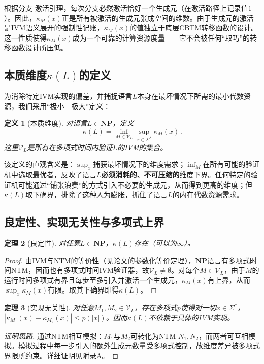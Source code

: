 \documentclass{ctexart}
\newtheorem{theorem}{定理}[section]
\newtheorem{definition}[theorem]{定义}
\newtheorem{proof}[theorem]{证明}
\begin{document}
	根据分支-激活引理，每次分支必然激活恰好一个生成元（在激活路径上记录值$1$）。因此，$\kappa_M(x)$正是所有被激活的生成元张成空间的维数。由于生成元的激活是IVM语义展开的强制性记账，$\kappa_M(x)$的值独立于底层CBTM转移函数的设计。这一性质使得$\kappa_M(x)$成为一个可靠的计算资源度量——它不会被任何``取巧''的转移函数设计所压低。
	
	\subsection{本质维度$\kappa(L)$的定义}
	
	为消除特定IVM实现的偏差，并捕捉语言$L$本身在最坏情况下所需的最小代数资源，我们采用``极小—极大''定义：
	
	\begin{definition}[本质维度]\label{def:kappa}
		对语言$L\in\mathbf{NP}$，定义
		\[
		\boxed{\ \kappa(L)=\inf_{M\in\mathcal{V}_L}\sup_{x\in\Sigma^*}\kappa_M(x)\ }.
		\]
		这里$\mathcal{V}_L$是所有在多项式时间内验证$L$的IVM的集合。
	\end{definition}
	
	该定义的直观含义是：$\sup_x$捕获最坏情况下的维度需求；$\inf_M$在所有可能的验证机中选取最优者，反映了语言$L$\textbf{必须消耗的、不可压缩的}维度下界。任何特定的验证机可能通过``铺张浪费''的方式引入不必要的生成元，从而得到更高的维度；但$\kappa(L)$取下确界，排除了这种人为膨胀，抓住了语言$L$的内在代数资源需求。
	
	\subsection{良定性、实现无关性与多项式上界}
	
	\begin{theorem}[良定性]\label{thm:well-defined}
		对任意$L\in\mathbf{NP}$，$\kappa(L)$存在（可以为$\infty$）。
	\end{theorem}
	\begin{proof}
		由IVM与NTM的等价性（见论文\cite{models2026}的参数化等价定理），$\mathbf{NP}$语言有多项式时间NTM，因而也有多项式时间IVM验证器，故$\mathcal{V}_L\neq\emptyset$。对每个$M\in\mathcal{V}_L$，由于$M$的运行时间多项式有界且每步至多引入并激活一个生成元，$\kappa_M(x)$有上界，从而$\sup_x\kappa_M(x)$有限。取其下确界即得$\kappa(L)$。
	\end{proof}
	
	\begin{theorem}[实现无关性]\label{thm:implementation-indep}
		对任意$M_1,M_2\in\mathcal{V}_L$，存在多项式$p$使得对一切$x\in\Sigma^*$，$|\kappa_{M_1}(x)-\kappa_{M_2}(x)|\le p(|x|)$。因而$\kappa(L)$不依赖于具体的IVM实现。
	\end{theorem}
	\begin{proof}[证明思路]
		通过NTM相互模拟：$M_1$与$M_2$可转化为NTM $N_1,N_2$，而两者可互相模拟。模拟过程中每一步引入的额外生成元数量受多项式控制，故维度差异被多项式界限所约束。详细证明见附录A。
	\end{proof}
	
\end{document}

